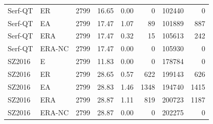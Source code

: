 \begin{table}[t]
\begin{tabular}{@{}llrrrrrr@{}}
Serf-QT & ER & 2799 & 16.65 & 0.00 & 0 & 102440 & 0 \\
Serf-QT & EA & 2799 & 17.47 & 1.07 & 89 & 101889 & 887 \\
Serf-QT & ERA & 2799 & 17.47 & 0.32 & 15 & 105613 & 242 \\
Serf-QT & ERA-NC & 2799 & 17.47 & 0.00 & 0 & 105930 & 0 \\
SZ2016 & E & 2799 & 11.83 & 0.00 & 0 & 178784 & 0 \\
SZ2016 & ER & 2799 & 28.65 & 0.57 & 622 & 199143 & 626 \\
SZ2016 & EA & 2799 & 28.83 & 1.46 & 1348 & 194740 & 1415 \\
SZ2016 & ERA & 2799 & 28.87 & 1.11 & 819 & 200723 & 1187 \\
SZ2016 & ERA-NC & 2799 & 28.87 & 0.00 & 0 & 202275 & 0 \\
\bottomrule
\end{tabular}
\end{table}

